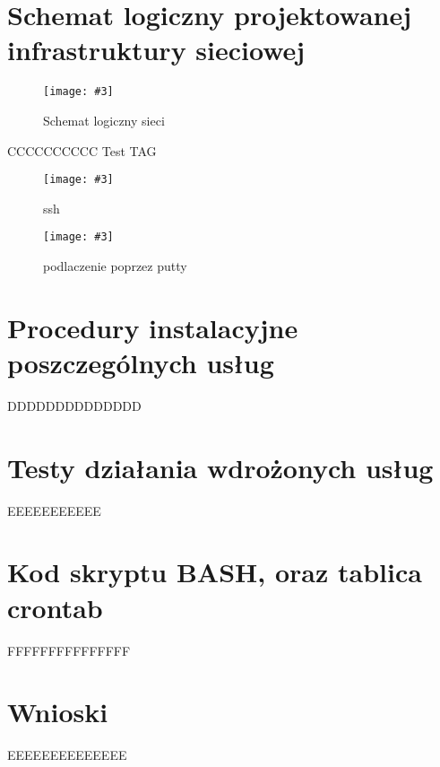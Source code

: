 \documentclass[a4paper]{article}
\newcommand*{\fg}[4][!htb]{
      \begin{figure*}[#1]
      \texttt{[image: \#3]}
      \caption{#4}
      \end{figure*}
}
\begin{document}
\section{Schemat logiczny projektowanej infrastruktury sieciowej}
\fg{width=\textwidth}{contents/VirtualBox-network-setup/setup5.png}{Schemat logiczny sieci}
CCCCCCCCCC
Test TAG
\fg{width=\textwidth}{contents/configuration/SSH/1.png}{ssh}
\fg{width=\textwidth}{contents/configuration/SSH/2.png}{podlaczenie poprzez putty}
\section{Procedury instalacyjne poszczególnych usług}
DDDDDDDDDDDDDD
\section{Testy działania wdrożonych usług}
EEEEEEEEEEE
\section{Kod skryptu BASH, oraz tablica crontab}
FFFFFFFFFFFFFFF
\section{Wnioski}
EEEEEEEEEEEEEE
\newpage
\nocite{k8s-docs}
\nocite{k8s-blog}
\nocite{k8s-github}
\printbibliography[heading=bibnumbered, label=Literatura, title=Literatura]
\end{document}
